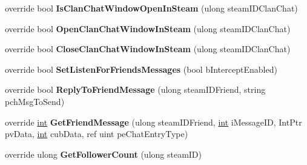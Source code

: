 \begin{DoxyCompactItemize}
\item 
\hypertarget{classValve_1_1Steamworks_1_1CSteamFriends_ae8491a749794ad77e3322a1c7261d14c}{}override bool {\bfseries Is\+Clan\+Chat\+Window\+Open\+In\+Steam} (ulong steam\+I\+D\+Clan\+Chat)\label{classValve_1_1Steamworks_1_1CSteamFriends_ae8491a749794ad77e3322a1c7261d14c}

\item 
\hypertarget{classValve_1_1Steamworks_1_1CSteamFriends_a773bee54c69fd287180ff4e404b9e00f}{}override bool {\bfseries Open\+Clan\+Chat\+Window\+In\+Steam} (ulong steam\+I\+D\+Clan\+Chat)\label{classValve_1_1Steamworks_1_1CSteamFriends_a773bee54c69fd287180ff4e404b9e00f}

\item 
\hypertarget{classValve_1_1Steamworks_1_1CSteamFriends_abe0011e77a75eb8cd030e387e6aa629e}{}override bool {\bfseries Close\+Clan\+Chat\+Window\+In\+Steam} (ulong steam\+I\+D\+Clan\+Chat)\label{classValve_1_1Steamworks_1_1CSteamFriends_abe0011e77a75eb8cd030e387e6aa629e}

\item 
\hypertarget{classValve_1_1Steamworks_1_1CSteamFriends_ac133e88d80da784a15715cfc3ad453b4}{}override bool {\bfseries Set\+Listen\+For\+Friends\+Messages} (bool b\+Intercept\+Enabled)\label{classValve_1_1Steamworks_1_1CSteamFriends_ac133e88d80da784a15715cfc3ad453b4}

\item 
\hypertarget{classValve_1_1Steamworks_1_1CSteamFriends_ab01a812806884d0b436d6988d6a9ff20}{}override bool {\bfseries Reply\+To\+Friend\+Message} (ulong steam\+I\+D\+Friend, string pch\+Msg\+To\+Send)\label{classValve_1_1Steamworks_1_1CSteamFriends_ab01a812806884d0b436d6988d6a9ff20}

\item 
\hypertarget{classValve_1_1Steamworks_1_1CSteamFriends_a0f29fe1765c1c7908f279303fa8c9fdb}{}override \hyperlink{SDL__thread_8h_a6a64f9be4433e4de6e2f2f548cf3c08e}{int} {\bfseries Get\+Friend\+Message} (ulong steam\+I\+D\+Friend, \hyperlink{SDL__thread_8h_a6a64f9be4433e4de6e2f2f548cf3c08e}{int} i\+Message\+I\+D, Int\+Ptr pv\+Data, \hyperlink{SDL__thread_8h_a6a64f9be4433e4de6e2f2f548cf3c08e}{int} cub\+Data, ref uint pe\+Chat\+Entry\+Type)\label{classValve_1_1Steamworks_1_1CSteamFriends_a0f29fe1765c1c7908f279303fa8c9fdb}

\item 
\hypertarget{classValve_1_1Steamworks_1_1CSteamFriends_ad05683d1715776c6a23912ba313d9fd4}{}override ulong {\bfseries Get\+Follower\+Count} (ulong steam\+I\+D)\label{classValve_1_1Steamworks_1_1CSteamFriends_ad05683d1715776c6a23912ba313d9fd4}


\end{DoxyCompactItemize}

